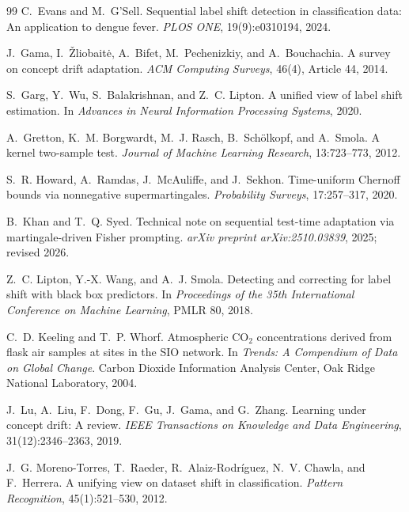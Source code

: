 \documentclass[11pt,a4paper]{article}
\theoremstyle{definition}
\newcommand{\1}{\mathbf{1}}
\begin{document}
\begin{thebibliography}{99}
C.~Evans and M.~G'Sell.
Sequential label shift detection in classification data: An application to dengue fever.
\textit{PLOS ONE}, 19(9):e0310194, 2024.

J.~Gama, I.~\v{Z}liobait\.{e}, A.~Bifet, M.~Pechenizkiy, and A.~Bouchachia.
A survey on concept drift adaptation.
\textit{ACM Computing Surveys}, 46(4), Article 44, 2014.

S.~Garg, Y.~Wu, S.~Balakrishnan, and Z.~C. Lipton.
A unified view of label shift estimation.
In \textit{Advances in Neural Information Processing Systems}, 2020.

A.~Gretton, K.~M. Borgwardt, M.~J. Rasch, B.~Sch\"olkopf, and A.~Smola.
A kernel two-sample test.
\textit{Journal of Machine Learning Research}, 13:723--773, 2012.

S.~R. Howard, A.~Ramdas, J.~McAuliffe, and J.~Sekhon.
Time-uniform Chernoff bounds via nonnegative supermartingales.
\textit{Probability Surveys}, 17:257--317, 2020.

B.~Khan and T.~Q. Syed.
Technical note on sequential test-time adaptation via martingale-driven Fisher prompting.
\textit{arXiv preprint arXiv:2510.03839}, 2025; revised 2026.

Z.~C. Lipton, Y.-X. Wang, and A.~J. Smola.
Detecting and correcting for label shift with black box predictors.
In \textit{Proceedings of the 35th International Conference on Machine Learning}, PMLR 80, 2018.

C.~D. Keeling and T.~P. Whorf.
Atmospheric CO$_2$ concentrations derived from flask air samples at sites in the SIO network.
In \textit{Trends: A Compendium of Data on Global Change}. Carbon Dioxide Information Analysis Center, Oak Ridge National Laboratory, 2004.

J.~Lu, A.~Liu, F.~Dong, F.~Gu, J.~Gama, and G.~Zhang.
Learning under concept drift: A review.
\textit{IEEE Transactions on Knowledge and Data Engineering}, 31(12):2346--2363, 2019.

J.~G. Moreno-Torres, T.~Raeder, R.~Alaiz-Rodr\'iguez, N.~V. Chawla, and F.~Herrera.
A unifying view on dataset shift in classification.
\textit{Pattern Recognition}, 45(1):521--530, 2012.


\end{thebibliography}
\end{document}
